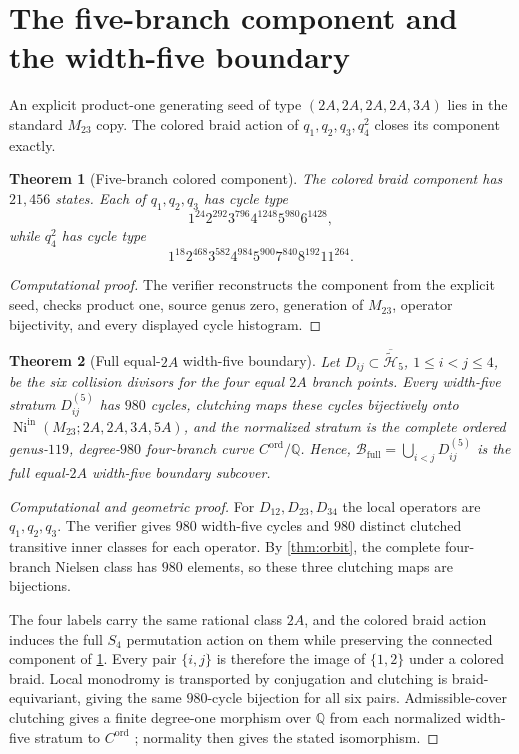 \documentclass[11pt]{article}
\newtheorem{theorem}{Theorem}[section]
\theoremstyle{remark}
\newcommand{\Q}{\mathbb Q}
\begin{document}
\section{The five-branch component and the width-five boundary}\label{sec:five}

An explicit product-one generating seed of type $(2A,2A,2A,2A,3A)$ lies in the standard $M_{23}$ copy.  The colored braid action of $q_1,q_2,q_3,q_4^2$ closes its component exactly.

\begin{theorem}[Five-branch colored component]\label{thm:fivecomponent}
The colored braid component has $21{,}456$ states.  Each of $q_1,q_2,q_3$ has cycle type
\[
 1^{24}2^{292}3^{796}4^{1248}5^{980}6^{1428},
\]
while $q_4^2$ has cycle type
\[
 1^{18}2^{468}3^{582}4^{984}5^{900}7^{840}8^{192}11^{264}.
\]
\end{theorem}

\begin{proof}[Computational proof]
The verifier reconstructs the component from the explicit seed, checks product one, source genus zero, generation of $M_{23}$, operator bijectivity, and every displayed cycle histogram.
\end{proof}

\begin{theorem}[Full equal-$2A$ width-five boundary]\label{thm:clutch}
Let $D_{ij}\subset\overline{\widetilde{\mathcal H}}_5$, $1\le i<j\le4$, be the six collision divisors for the four equal $2A$ branch points.  Every width-five stratum $D_{ij}^{(5)}$ has $980$ cycles, clutching maps these cycles bijectively onto $\operatorname{Ni}^{\mathrm{in}}(M_{23};2A,2A,3A,5A)$, and the normalized stratum is the complete ordered genus-$119$, degree-$980$ four-branch curve $C^{\mathrm{ord}}/\Q$.  Hence, $\mathcal B_{\mathrm{full}}=\bigcup_{i<j}D_{ij}^{(5)}$ is the full equal-$2A$ width-five boundary subcover.
\end{theorem}

\begin{proof}[Computational and geometric proof]
For $D_{12},D_{23},D_{34}$ the local operators are $q_1,q_2,q_3$.  The verifier gives $980$ width-five cycles and $980$ distinct clutched transitive inner classes for each operator.  By \cref{thm:orbit}, the complete four-branch Nielsen class has $980$ elements, so these three clutching maps are bijections.

The four labels carry the same rational class $2A$, and the colored braid action induces the full $S_4$ permutation action on them while preserving the connected component of \cref{thm:fivecomponent}.  Every pair $\{i,j\}$ is therefore the image of $\{1,2\}$ under a colored braid.  Local monodromy is transported by conjugation and clutching is braid-equivariant, giving the same $980$-cycle bijection for all six pairs.  Admissible-cover clutching gives a finite degree-one morphism over $\Q$ from each normalized width-five stratum to $C^{\mathrm{ord}}$ \cite{Wewers}; normality then gives the stated isomorphism.
\end{proof}
\end{document}
